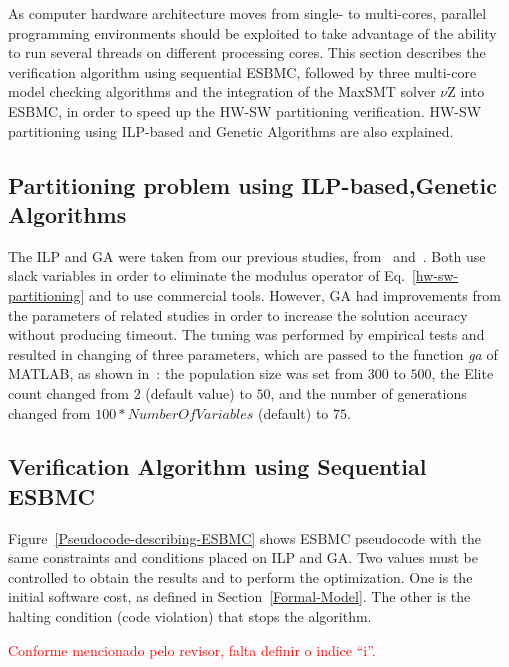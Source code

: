 \documentclass{doublecol-new}
\theoremstyle{TH}{
\newtheorem{lemma}{Lemma}
\newtheorem{theorem}[lemma]{Theorem}
\newtheorem{corrolary}[lemma]{Corrolary}
\newtheorem{conjecture}[lemma]{Conjecture}
\newtheorem{proposition}[lemma]{Proposition}
\newtheorem{claim}[lemma]{Claim}
\newtheorem{stheorem}[lemma]{Wrong Theorem}
\newtheorem{algorithm}{Algorithm}
}
\theoremstyle{THrm}{
\newtheorem{definition}{Definition}[section]
\newtheorem{question}{Question}[section]
\newtheorem{remark}{Remark}
\newtheorem{scheme}{Scheme}
}
\theoremstyle{THhit}{
\newtheorem{case}{Case}[section]
}
\begin{document}
As computer hardware architecture moves from single- to multi-cores, parallel programming environments should be exploited to take advantage of the ability to run several threads on different processing cores. This section describes the verification algorithm using sequential ESBMC, followed by three multi-core model checking algorithms and the integration of the MaxSMT solver $\nu$Z into ESBMC, in order to speed up the HW-SW partitioning verification. HW-SW partitioning using ILP-based and Genetic Algorithms are also explained.

\subsection{Partitioning problem using ILP-based,Genetic Algorithms}
\label{ILPGA}

The ILP and GA were taken from our previous studies, from~\cite{Trindade2015} and~\cite{Trindade2016}. Both use slack variables in order to eliminate the modulus operator of Eq.~\eqref{hw-sw-partitioning} and to use commercial tools. However, GA had improvements from the parameters of related studies in order to increase the solution accuracy without producing timeout. The tuning was performed by empirical tests and resulted in changing of three parameters, which are passed to the function \textit{ga} of MATLAB, as shown in~\cite{TheMathWorks2013}: the population size was set from $300$ to $500$, the Elite count changed from $2$ (default value) to $50$, and the number of generations changed from $100*NumberOfVariables$ (default) to $75$.

\subsection{Verification Algorithm using Sequential ESBMC}
\label{Verification-Algorithm-using-ESBMC}

Figure~\ref{Pseudocode-describing-ESBMC} shows ESBMC pseudocode with the same constraints and conditions placed on ILP and GA. Two values must be controlled to obtain the results and to perform the optimization. One is the initial software cost, as defined in Section~\ref{Formal-Model}. The other is the halting condition (code violation) that stops the algorithm.

\textcolor{red}{Conforme mencionado pelo revisor, falta definir o indice ``i''.}
\end{document}
